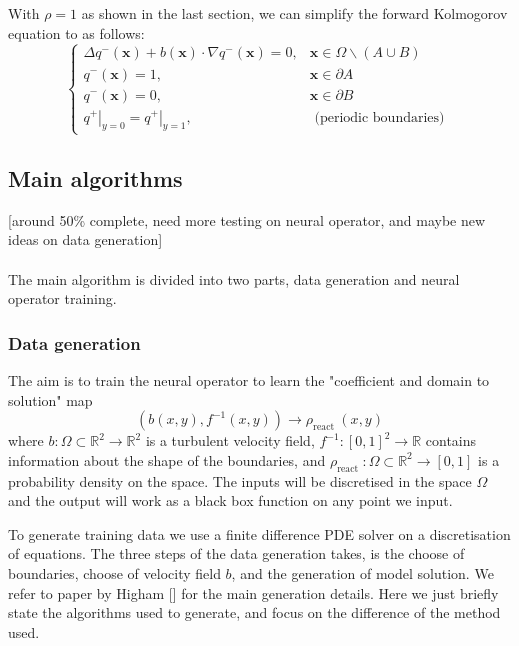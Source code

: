 \documentclass{article}
\begin{document}
With $\rho=1$ as shown in the last section, we can simplify the forward Kolmogorov equation to as follows: 
$$
\begin{cases}\Delta q^{-}(\boldsymbol{x})+b(\boldsymbol{x}) \cdot \nabla q^{-}(\boldsymbol{x})=0, & \boldsymbol{x} \in \Omega \backslash(A \cup B) \\ q^{-}(\boldsymbol{x})=1, & \boldsymbol{x} \in \partial A \\ q^{-}(\boldsymbol{x})=0, & \boldsymbol{x} \in \partial B \\ \left.q^{+}\right|_{y=0}=\left.q^{+}\right|_{y=1}, & \text { (periodic boundaries) }\end{cases}
$$

\subsection{Main algorithms}

[around 50\% complete, need more testing on neural operator, and maybe new ideas on data generation] \\ \\

The main algorithm is divided into two parts, data generation and neural operator training.

\subsubsection{Data generation}

The aim is to train the neural operator to learn the "coefficient and domain to solution" map
$$
\left(b(x, y), f^{-1}(x, y)\right) \rightarrow \rho_{\text {react }}(x, y)
$$
where $b: \Omega \subset \mathbb{R}^{2} \rightarrow \mathbb{R}^{2}$ is a turbulent velocity field, $f^{-1}:[0,1]^{2} \rightarrow \mathbb{R}$ contains information about the shape of the boundaries, and $\rho_{\text {react }}: \Omega \subset \mathbb{R}^{2} \rightarrow[0,1]$ is a probability density on the space. The inputs will be discretised in the space $\Omega$ and the output will work as a black box function on any point we input.

To generate training data we use a finite difference PDE solver on a discretisation of equations. The three steps of the data generation takes, is the choose of boundaries, choose of velocity field $b$, and the generation of model solution. We refer to paper by Higham [] for the main generation details. Here we just briefly state the algorithms used to generate, and focus on the difference of the method used. \\
\end{document}
